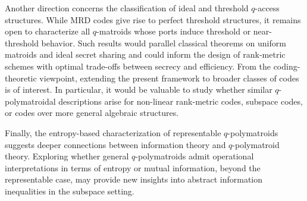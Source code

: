 \documentclass[onecolumn,draftclsnofoot,12pt]{IEEEtran}
\theoremstyle{plain} %
\theoremstyle{definition}
\begin{document}
Another direction concerns the classification of ideal and threshold $q$-access structures. While MRD codes give rise to perfect threshold structures, it remains open to characterize all $q$-matroids whose ports induce threshold or near-threshold behavior. Such results would parallel classical theorems on uniform matroids and ideal secret sharing and could inform the design of rank-metric schemes with optimal trade-offs between secrecy and efficiency. From the coding-theoretic viewpoint, extending the present framework to broader classes of codes is of interest. In particular, it would be valuable to study whether similar $q$-polymatroidal descriptions arise for non-linear rank-metric codes, subspace codes, or codes over more general algebraic structures.

Finally, the entropy-based characterization of representable $q$-polymatroids suggests deeper connections between information theory and $q$-polymatroid theory. Exploring whether general $q$-polymatroids admit operational interpretations in terms of entropy or mutual information, beyond the representable case, may provide new insights into abstract information inequalities in the subspace setting.

\pagebreak



\end{document}
